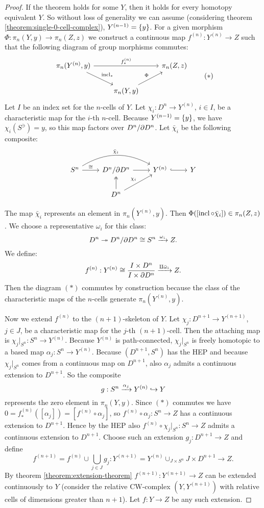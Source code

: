 \begin{proof}
If the theorem holds for some $Y$, then it holds for every homotopy equivalent $Y$. So without loss of generality we can assume (considering theorem \ref{theorem:single-0-cell-complex}), $Y^{({n-1})}=\{y\}$. For a given morphism $\Phi:\pi_n(Y,y)\to\pi_n(Z,z)$ we construct a continuous map $f^{(n)}:Y^{(n)}\to Z$ such that the following diagram of group morphisms commutes:
\[\begin{tikzcd}
\pi_n(Y^{(n)},y) \ar[dr,"\incl_*"] \ar[rr,"f^{(n)}_*"] & & \pi_n(Z,z) \\
& \pi_n(Y,y) \ar[ur,"\Phi"] &
\end{tikzcd}
\tag{$*$}\]
Let $I$ be an index set for the $n$-cells of $Y$. Let $\chi_i:D^n\to Y^{(n)}$, $i\in I$, be a characteristic map for the $i$-th $n$-cell. Because $Y^{({n-1})}=\{y\}$, we have $\chi_i(S^\ni)=y$, so this map factors over $D^n/\partial D^n$. Let $\bar\chi_i$ be the following composite:
\[\begin{tikzcd}
S^n \ar[r,"\cong"] \ar[rr,bend left,"\bar\chi_i"] & D^n/\de D^n \ar[r] & Y^{(n)} \ar[r,hook] & Y \\
& D^n \ar[u,two heads] \ar[ur,"\chi_i"] & & 
\end{tikzcd}\]

The map $\bar\chi_i$ represents an element in $\pi_n(Y^{(n)},y)$. Then $\Phi([\operatorname{incl}\circ\bar\chi_i])\in\pi_n(Z,z)$. We choose a representative $\omega_i$ for this class:
\[D^n\twoheadrightarrow D^n/\partial D^n\cong S^n\xrightarrow{\omega_i}Z.\]
We define:
\[f^{(n)}:Y^{(n)}\cong\frac{I\times D^n}{I\times\partial D^n}\xrightarrow{\amalg\bar\omega_i}Z.\]
Then the diagram $(*)$ commutes by construction because the class of the characteristic maps of the $n$-cells generate $\pi_n(Y^{(n)},y)$.

Now we extend $f^{(n)}$ to the $(n+1)$-skeleton of $Y$. Let $\chi_j:D^{n+1}\to Y^{(n+1)}$, $j\in J$, be a characteristic map for the $j$-th $(n+1)$-cell. Then the attaching map is $\chi_j|_{S^n}:S^n\to Y^{(n)}$. Because $Y^{(n)}$ is path-connected, $\chi_j|_{S^n}$ is freely homotopic to a based map $\alpha_j:S^n\to Y^{(n)}$. Because $(D^{n+1},S^n)$ has the HEP and because $\chi_j|_{S^n}$ comes from a continuous map on $D^{n+1}$, also $\alpha_j$ admits a continuous extension to $D^{n+1}$. So the composite
\[g:S^n\xrightarrow{\alpha_j}Y^{(n)}\hookrightarrow Y\]
represents the zero element in $\pi_n(Y,y)$. Since $(*)$ commutes we have $0=f^{(n)}_*([\alpha_j])=[f^{(n)}\circ\alpha_j]$, so $f^{(n)}\circ\alpha_j:S^n\to Z$ has a continuous extension to $D^{n+1}$. Hence by the HEP also $f^{(n)}\circ\chi_j|_{S^n}:S^n\to Z$ admits a continuous extension to $D^{n+1}$. Choose such an extension $g_j:D^{n+1}\to Z$ and define
\[f^{(n+1)}=f^{(n)}\cup\bigcup_{j\in J}g_j:Y^{(n+1)}=Y^{(n)}\cup_{J\times S^n}J\times D^{n+1}\to Z.\]
By theorem \ref{theorem:extension-theorem} $f^{(n+1)}:Y^{(n+1)}\to Z$ can be extended continuously to $Y$ (consider the relative CW-complex $(Y,Y^{(n+1)})$ with relative cells of dimensions greater than $n+1$). Let $f:Y\to Z$ be any such extension.


\end{proof}
